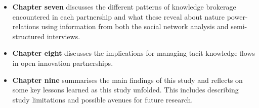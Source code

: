 \begin{itemize}[leftmargin=0pt]
  \item[] \textbf{Chapter seven} discusses the different patterns of knowledge brokerage encountered in each partnership and what these reveal about nature power-relations using information from both the social network analysis and semi-structured interviews.
  
  \item[] \textbf{Chapter eight} discusses the implications for managing tacit knowledge flows in open innovation partnerships. 
  
  \item[] \textbf{Chapter nine} summarises the main findings of this study and reflects on some key lessons learned as this study unfolded. This includes describing study limitations and possible avenues for future research. 
\end{itemize}